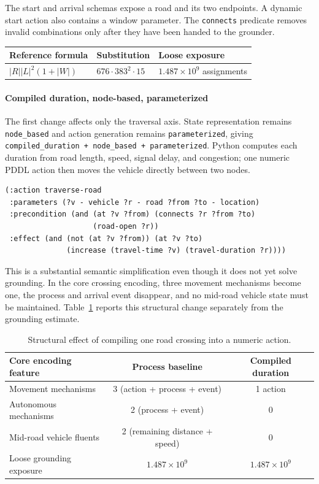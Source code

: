 \documentclass[10pt]{article}
\begin{document}
The start and arrival schemas expose a road and its two endpoints. A dynamic
start action also contains a window parameter. The \texttt{connects} predicate
removes invalid combinations only after they have been handed to the grounder.

\begin{center}
\scriptsize
\begin{tabular}{@{}lll@{}}
\toprule
Reference formula & Substitution & Loose exposure \\
\midrule
$|R||L|^2(1+|W|)$ & $676\cdot383^2\cdot15$ & $1.487\times10^9$ assignments \\
\bottomrule
\end{tabular}
\end{center}

\paragraph{Compiled duration, node-based, parameterized}
The first change affects only the traversal axis. State representation remains
\texttt{node\_based} and action generation remains \texttt{parameterized},
giving \texttt{compiled\_duration + node\_based + parameterized}. Python
computes each duration from road length, speed, signal delay, and congestion;
one numeric PDDL action then moves the vehicle directly between two nodes.

\begin{lstlisting}
(:action traverse-road
 :parameters (?v - vehicle ?r - road ?from ?to - location)
 :precondition (and (at ?v ?from) (connects ?r ?from ?to)
                    (road-open ?r))
 :effect (and (not (at ?v ?from)) (at ?v ?to)
              (increase (travel-time ?v) (travel-duration ?r))))
\end{lstlisting}

This is a substantial semantic simplification even though it does not yet solve
grounding. In the core crossing encoding, three movement mechanisms become one,
the process and arrival event disappear, and no mid-road vehicle state must be
maintained. Table~\ref{tab:traversal-simplification} reports this structural
change separately from the grounding estimate.

\begin{table}[H]
\centering
\caption{Structural effect of compiling one road crossing into a numeric action.}
\label{tab:traversal-simplification}
\scriptsize
\begin{tabular}{@{}lcc@{}}
\toprule
Core encoding feature & Process baseline & Compiled duration \\
\midrule
Movement mechanisms & 3 (action + process + event) & 1 action \\
Autonomous mechanisms & 2 (process + event) & 0 \\
Mid-road vehicle fluents & 2 (remaining distance + speed) & 0 \\
Loose grounding exposure & $1.487\times10^9$ & $1.487\times10^9$ \\
\bottomrule
\end{tabular}
\end{table}
\end{document}
